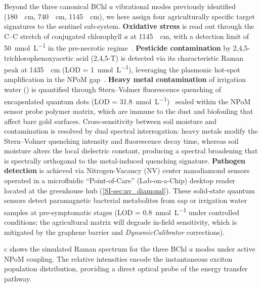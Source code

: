\documentclass[onecolumn,a4paper,12pt]{article}
\begin{document}
Beyond the three canonical BChl $a$ vibrational modes previously identified (\qty{180}{\per\cm}, \qty{740}{\per\cm}, \qty{1145}{\per\cm}), we here assign four agriculturally specific target signatures to the sentinel sub-system.
\textbf{Oxidative stress} is read out through the C--C stretch of conjugated chlorophyll $a$ at \qty{1145}{\per\cm}, with a detection limit of \qty{50}{\nano\mol\per\L} in the pre-necrotic regime~\cite{CiallaMay2024}.
\textbf{Pesticide contamination} by 2,4,5-trichlorophenoxyacetic acid (2,4,5-T) is detected via its characteristic Raman peak at \qty{1435}{\per\cm} (LOD = \qty{1}{\nano\mol\per\L}), leveraging the plasmonic hot-spot amplification in the NPoM gap~\cite{CiallaMay2024}.
\textbf{Heavy metal contamination} of irrigation water () is quantified through Stern--Volmer fluorescence quenching of encapsulated  quantum dots (LOD = \qty{31.8}{\nano\mol\per\L})~\cite{Mohammed2023} sealed within the NPoM sensor probe polymer matrix, which are immune to the dust and biofouling that affect bare gold surfaces.
Cross-sensitivity between soil moisture and  contamination is resolved by dual spectral interrogation: heavy metals modify the Stern--Volmer quenching intensity and fluorescence decay time, whereas soil moisture alters the local dielectric constant, producing a spectral broadening that is spectrally orthogonal to the metal-induced quenching signature.
\textbf{Pathogen detection} is achieved via Nitrogen-Vacancy (NV) center nanodiamond sensors operated in a microfluidic ``Point-of-Care'' (Lab-on-a-Chip) desktop reader located at the greenhouse hub (\cref{SI-sec:nv_diamond}). These solid-state quantum sensors detect paramagnetic bacterial metabolites from sap or irrigation water samples at pre-symptomatic stages (LOD = \qty{0.8}{\nano\mol\per\L} under controlled conditions; the agricultural matrix will degrade in-field sensitivity, which is mitigated by the graphene barrier and \textit{DynamicCalibrator} corrections).

c shows the simulated Raman spectrum for the three BChl $a$ modes under active NPoM coupling.
The relative intensities encode the instantaneous exciton population distribution, providing a direct optical probe of the energy transfer pathway.
\end{document}
